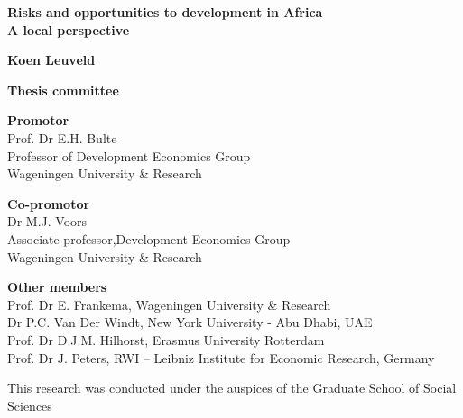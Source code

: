 \begin{titlepage}
   \begin{center}
          \vspace*{1cm}

          \Huge
          \textbf{Risks and opportunities to development in Africa \\ \LARGE A local perspective}


          \vfill
          \large     
          \textbf{Koen Leuveld}
               
          \vspace{0.8cm}
   \end{center}
\end{titlepage}


\begin{titlepage}
   \vspace*{1cm}
   \vspace*{\fill}

   \noindent
   \textbf{Thesis committee}\\
   \vspace*{0.5cm}
   
   \noindent
   \textbf{Promotor} \\
   Prof. Dr E.H. Bulte \\
   Professor of Development Economics Group \\
   Wageningen University \& Research\\
   \vspace*{0.5cm}
   
   \noindent
   \textbf{Co-promotor} \\
   Dr M.J. Voors \\
   Associate professor,Development Economics Group \\
   Wageningen University \& Research\\
   \vspace*{0.5cm}
   
   \noindent
   \textbf{Other members} \\
   Prof. Dr E. Frankema, Wageningen University \& Research\\
   Dr P.C. Van Der Windt, New York University - Abu Dhabi, UAE\\
   Prof. Dr D.J.M. Hilhorst, Erasmus University Rotterdam\\
   Prof. Dr J. Peters, RWI – Leibniz Institute for Economic Research, Germany\\
   \vspace*{0.5cm}
   
   \noindent
   This research was conducted under the auspices of the Graduate School of Social Sciences
   \vspace{0.8cm}
\end{titlepage}



